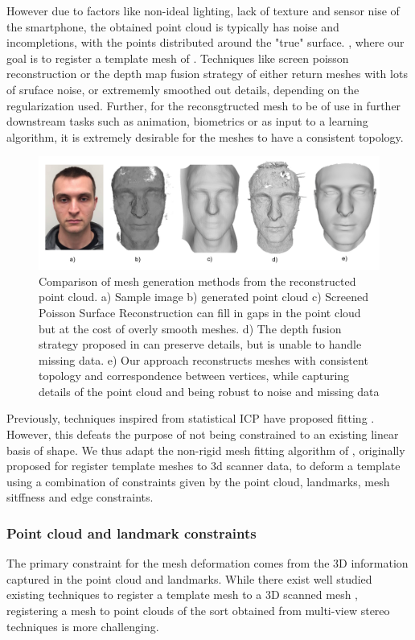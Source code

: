 \documentclass[10pt,twocolumn,letterpaper]{article}
\begin{document}
However due to factors like non-ideal lighting, lack of texture and sensor nise of the smartphone, the obtained point cloud is typically has noise and incompletions, with the points distributed around the "true" surface.
 , where our goal is to register a template mesh of  . Techniques like screen poisson reconstruction or the depth map fusion strategy of \cite{} either return meshes with lots of sruface noise, or extrememly smoothed out details, depending on the regularization used. Further, for the reconsgtructed mesh to be of use in further downstream tasks such as animation, biometrics or as input to a learning algorithm, it is extremely desirable for the meshes to have a consistent topology. \\
 \begin{figure}[t]
\begin{center}
   \includegraphics[width=0.95\linewidth]{images/meshing_compare.png}
\end{center}
   \caption{Comparison of mesh generation methods from the reconstructed point cloud. a) Sample image b) generated point cloud c) Screened Poisson Surface Reconstruction\cite{kazhdan2013screened} can fill in gaps in the point cloud but at the cost of overly smooth meshes. d) The depth fusion strategy proposed in \cite{hernandez2015near} can preserve details, but is unable to handle missing data. e) Our approach reconstructs meshes with consistent topology and correspondence between vertices, while capturing details of the point cloud and being robust to noise and missing data }
\label{fig:mesh_comp}
\end{figure}

 Previously, techniques inspired from statistical ICP have proposed fitting  . However, this defeats the purpose of not being constrained to an existing linear basis of shape.
 We thus adapt the non-rigid mesh fitting algorithm of \cite{amberg2007optimal}, originally proposed for register template meshes to 3d scanner data, to deform a template using a combination of constraints given by the point cloud, landmarks, mesh sitffness and edge constraints.
 \subsubsection{Point cloud and landmark constraints}
 The primary constraint for the mesh deformation comes from the 3D information captured in the point cloud and landmarks.
 While there exist well studied existing techniques to register a template mesh to a 3D scanned mesh \cite{amberg2007optimal}, registering a mesh to point clouds of the sort obtained from multi-view stereo techniques is more challenging. 
 
\end{document}
